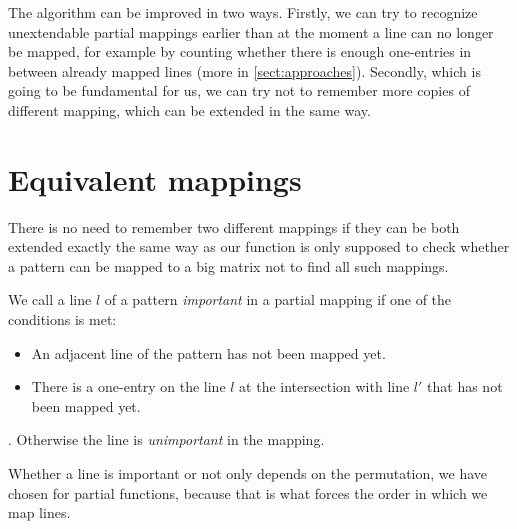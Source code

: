 The algorithm can be improved in two ways. Firstly, we can try to recognize unextendable partial mappings earlier than at the moment a line can no longer be mapped, for example by counting whether there is enough one-entries in between already mapped lines (more in \autoref{sect:approaches}). Secondly, which is going to be fundamental for us, we can try not to remember more copies of different mapping, which can be extended in the same way.

\section{Equivalent mappings}
There is no need to remember two different mappings if they can be both extended exactly the same way as our function is only supposed to check whether a pattern can be mapped to a big matrix not to find all such mappings.
\begin{defn}
We call a line $l$ of a pattern \emph{important} in a partial mapping if one of the conditions is met:
\begin{itemize}
\item An adjacent line of the pattern has not been mapped yet.
\item There is a one-entry on the line $l$ at the intersection with line $l'$ that has not been mapped yet.
\end{itemize}.
Otherwise the line is \emph{unimportant} in the mapping.
\end{defn}
Whether a line is important or not only depends on the permutation, we have chosen for partial functions, because that is what forces the order in which we map lines.

